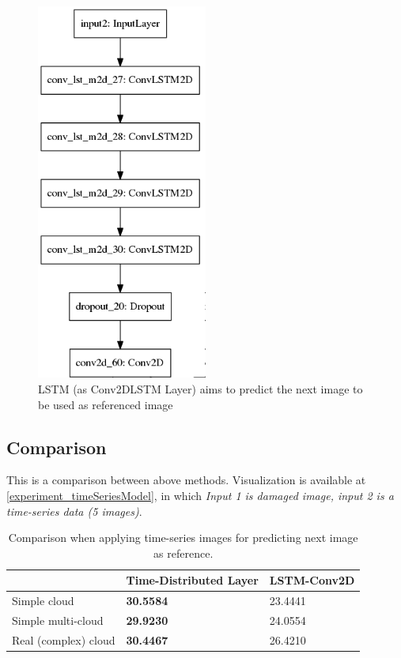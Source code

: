 \begin{figure}[]
	\centering
	\includegraphics[width=0.5\textwidth]{figures/modelConv2DLSTM_1.png}
	\caption{LSTM (as Conv2DLSTM Layer) aims to predict the next image to be used as referenced image}
	\label{fig:modelConv2DLSTM_1}
\end{figure}

\subsection{Comparison}

This is a comparison between above methods. Visualization is available at \ref{experiment_timeSeriesModel}, in which \textit{Input 1 is damaged image, input 2 is a time-series data (5 images)}. 

\begin{table}[]
	\centering
	\begin{tabularx}{\textwidth}{|Y|Y|Y|}
		\hline
		& Time-Distributed Layer & LSTM-Conv2D \\ \hline
		Simple cloud         & \textbf{30.5584}                                                  & 23.4441     \\ \hline
		Simple multi-cloud   & \textbf{29.9230}                                                  & 24.0554     \\ \hline
		Real (complex) cloud & \textbf{30.4467}                                                  & 26.4210     \\ \hline
	\end{tabularx}
	\caption{Comparison when applying time-series images for predicting next image as reference.}
\end{table}

